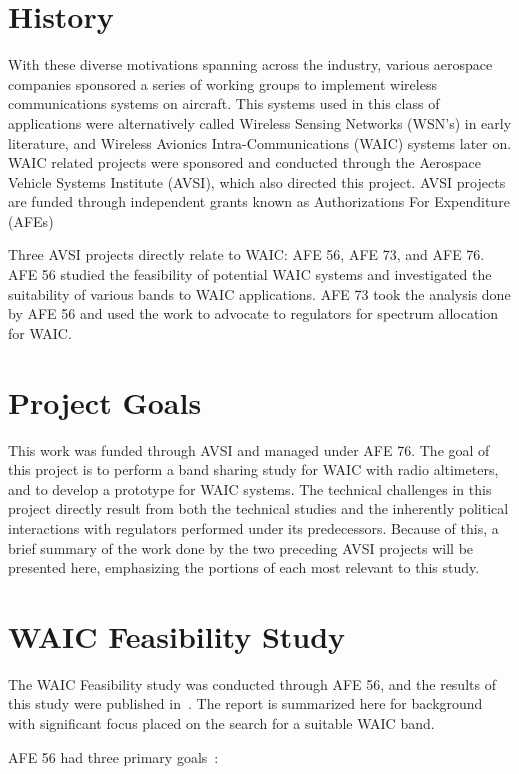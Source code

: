 \section{History} 

With these diverse motivations spanning across the industry, various aerospace companies sponsored a series of working groups to implement wireless communications systems on aircraft. This systems used in this class of applications were alternatively called Wireless Sensing Networks (WSN's) in early literature, and Wireless Avionics Intra-Communications (WAIC) systems later on. WAIC related projects were sponsored and conducted through the Aerospace Vehicle Systems Institute (AVSI), which also directed this project. AVSI projects are funded through independent grants known as Authorizations For Expenditure (AFEs)

Three AVSI projects directly relate to WAIC: AFE 56, AFE 73, and AFE 76. AFE 56 studied the feasibility of potential WAIC systems  and investigated the suitability of various bands to WAIC applications. AFE 73 took the analysis done by AFE 56 and used the work to advocate to regulators for spectrum allocation for WAIC. 

\section{Project Goals}
This work was funded through AVSI and managed under AFE 76. The goal of this project is to perform a band sharing study for WAIC with radio altimeters, and to develop a prototype for WAIC systems. The technical challenges in this project directly result from both the technical studies and the inherently political interactions with regulators performed under its predecessors. Because of this, a brief summary of the work done by the two preceding AVSI projects will be presented here, emphasizing the portions of each most relevant to this study. 

\section{WAIC Feasibility Study}
The WAIC Feasibility study was conducted through AFE 56, and the results of this study were published in~\cite{ferrell_feasibility_2007}. The report is summarized here for background with significant focus placed on the search for a suitable WAIC band. 

AFE 56 had three primary goals~\cite{ferrell_feasibility_2007}: 

